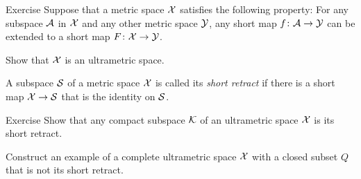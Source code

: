 \begin{thm}{Exercise}\label{ex:ultrametric}
Suppose that a metric space $\mathcal{X}$ satisfies the following property:
For any subspace $\mathcal{A}$ in $\mathcal{X}$ and any other metric space $\mathcal{Y}$, any short map $f\colon\mathcal{A}\to \mathcal{Y}$ can be extended to a short map $F\colon\mathcal{X}\to \mathcal{Y}$.

Show that $\mathcal{X}$ is an ultrametric space.
\end{thm}

A subspace $\mathcal{S}$ of a metric space $\mathcal{X}$ is called its \emph{short retract} if there is a short map $\mathcal{X}\to \mathcal{S}$ that is the identity on $\mathcal{S}$.

\begin{thm}{Exercise}\label{ex:ultrametric-converse}
Show that any compact subspace $\mathcal{K}$ of an ultrametric space $\mathcal{X}$ is its short retract.

Construct an example of a complete ultrametric space $\mathcal{X}$ with a closed subset $Q$ that is not its short retract.
\end{thm}

